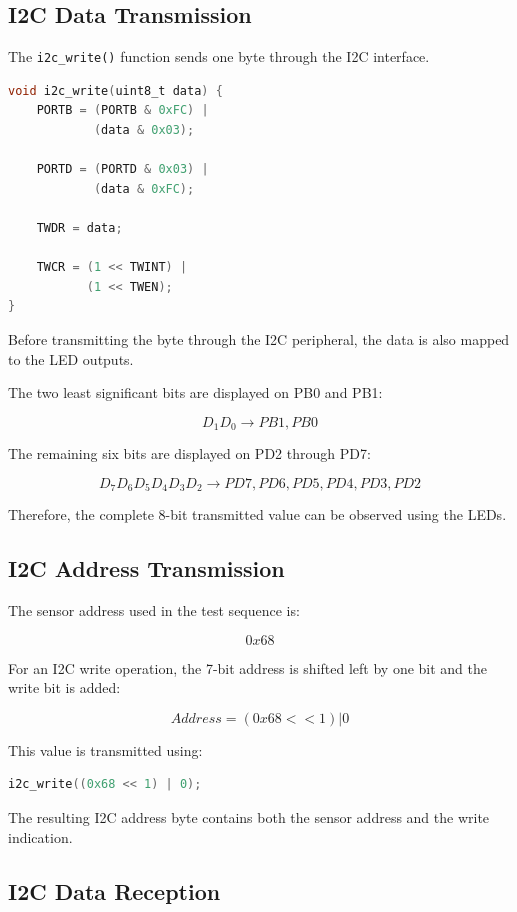 \documentclass[12pt,a4paper]{article}
\begin{document}
\subsection{I2C Data Transmission}

The \texttt{i2c\_write()} function sends one byte through the I2C
interface.

\begin{lstlisting}[language=C]
void i2c_write(uint8_t data) {
    PORTB = (PORTB & 0xFC) |
            (data & 0x03);

    PORTD = (PORTD & 0x03) |
            (data & 0xFC);

    TWDR = data;

    TWCR = (1 << TWINT) |
           (1 << TWEN);
}
\end{lstlisting}

Before transmitting the byte through the I2C peripheral, the data is
also mapped to the LED outputs.

The two least significant bits are displayed on PB0 and PB1:

\[
D_1D_0
\rightarrow
PB1,PB0
\]

The remaining six bits are displayed on PD2 through PD7:

\[
D_7D_6D_5D_4D_3D_2
\rightarrow
PD7,PD6,PD5,PD4,PD3,PD2
\]

Therefore, the complete 8-bit transmitted value can be observed using
the LEDs.

\subsection{I2C Address Transmission}

The sensor address used in the test sequence is:

\[
0x68
\]

For an I2C write operation, the 7-bit address is shifted left by one
bit and the write bit is added:

\[
Address
=
(0x68 << 1) | 0
\]

This value is transmitted using:

\begin{lstlisting}[language=C]
i2c_write((0x68 << 1) | 0);
\end{lstlisting}

The resulting I2C address byte contains both the sensor address and the
write indication.

\subsection{I2C Data Reception}
\end{document}
